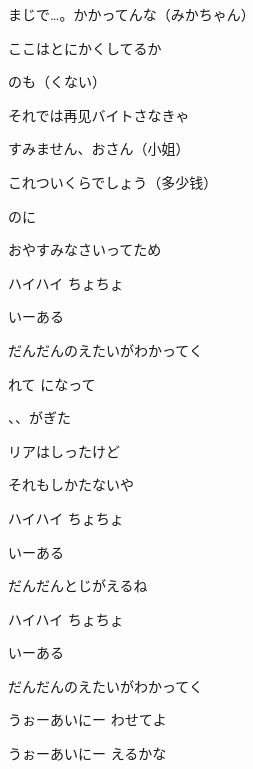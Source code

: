 \bigskip

まじで…。かかってんな（みかちゃん）

ここはとにかくしてるか

のも（くない）

それでは{\fontcn 再见}バイトさなきゃ

\bigskip

すみません、おさん（{\fontcn 小姐}）

これついくらでしょう（{\fontcn 多少钱}）

のに

おやすみなさいってため

\bigskip

ハイハイ ちょちょ

いーある

だんだんのえたいがわかってく

\bigskip

れて になって

、、がぎた

リアはしったけど

それもしかたないや

\bigskip

ハイハイ ちょちょ

いーある

だんだんとじがえるね

\bigskip

ハイハイ ちょちょ

いーある

だんだんのえたいがわかってく

うぉーあいにー わせてよ

\bigskip

うぉーあいにー えるかな
